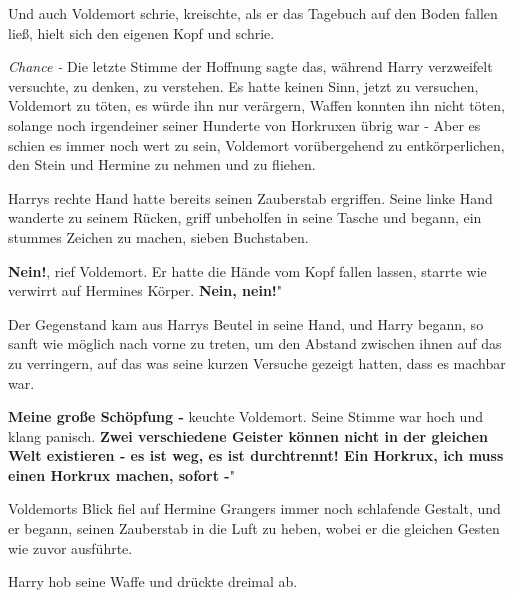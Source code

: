 Und auch Voldemort schrie, kreischte, als er das Tagebuch auf den Boden fallen
ließ, hielt sich den eigenen Kopf und schrie.

\emph{Chance -} Die letzte Stimme der Hoffnung sagte das, während Harry
verzweifelt versuchte, zu denken, zu verstehen. Es hatte keinen Sinn, jetzt zu
versuchen, Voldemort zu töten, es würde ihn nur verärgern, Waffen konnten ihn
nicht töten, solange noch irgendeiner seiner Hunderte von Horkruxen übrig war -
Aber es schien es immer noch wert zu sein, Voldemort vorübergehend zu
entkörperlichen, den Stein und Hermine zu nehmen und zu fliehen.

Harrys rechte Hand hatte bereits seinen Zauberstab ergriffen. Seine linke Hand
wanderte zu seinem Rücken, griff unbeholfen in seine Tasche und begann, ein
stummes Zeichen zu machen, sieben Buchstaben.

\glqq{}\textbf{Nein!}\grqq{}, rief Voldemort. Er hatte die Hände vom Kopf fallen
lassen, starrte wie verwirrt auf Hermines Körper. \glqq{}\textbf{Nein, nein!}"

Der Gegenstand kam aus Harrys Beutel in seine Hand, und Harry begann, so sanft
wie möglich nach vorne zu treten, um den Abstand zwischen ihnen auf das zu
verringern, auf das was seine kurzen Versuche gezeigt hatten, dass es machbar
war.

\glqq{}\textbf{Meine große Schöpfung -}\grqq{} keuchte Voldemort. Seine Stimme
war hoch und klang panisch. \glqq{}\textbf{Zwei verschiedene Geister können nicht
in der gleichen Welt existieren - es ist weg, es ist durchtrennt! Ein Horkrux,
ich muss einen Horkrux machen, sofort -}"

Voldemorts Blick fiel auf Hermine Grangers immer noch schlafende Gestalt, und er
begann, seinen Zauberstab in die Luft zu heben, wobei er die gleichen Gesten wie
zuvor ausführte.

Harry hob seine Waffe und drückte dreimal ab.

